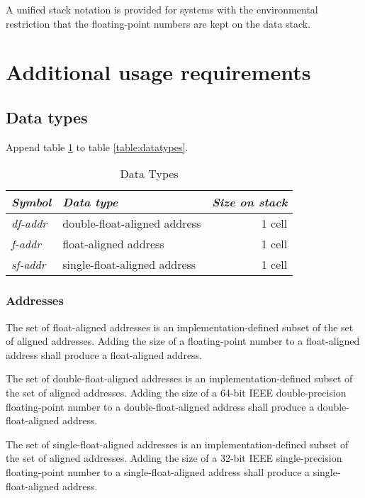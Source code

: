 A unified stack notation is provided for systems with the environmental
restriction that the floating-point numbers are kept on the data stack.

\section{Additional usage requirements} %

\subsection{Data types} %
\label{float:datatypes}

Append table \ref{float:types} to table \ref{table:datatypes}.

\begin{table}[ht]
  \begin{center}
	\caption{Data Types}
	\label{float:types}
	\begin{tabular}{llr}
	\hline\hline
	\emph{Symbol} & \emph{Data type} & \emph{Size on stack} \\
	\hline
	\emph{df-addr}	& double-float-aligned address	& 1 cell \\
	\emph{f-addr}	& float-aligned address				& 1 cell \\
	\emph{sf-addr}	& single-float-aligned address	& 1 cell \\
	\hline\hline
	\end{tabular}
  \end{center}
\end{table}

\subsubsection{Addresses} %
\label{float:addr}

The set of float-aligned addresses is an implementation-defined
subset of the set of aligned addresses. Adding the size of a
floating-point number to a float-aligned address shall produce
a float-aligned address.

The set of double-float-aligned addresses is an implementation-defined
subset of the set of aligned addresses. Adding the size of a 64-bit
IEEE double-precision floating-point number to a double-float-aligned
address shall produce a double-float-aligned address.

The set of single-float-aligned addresses is an implementation-defined
subset of the set of aligned addresses. Adding the size of a 32-bit
IEEE single-precision floating-point number to a single-float-aligned
address shall produce a single-float-aligned address.

